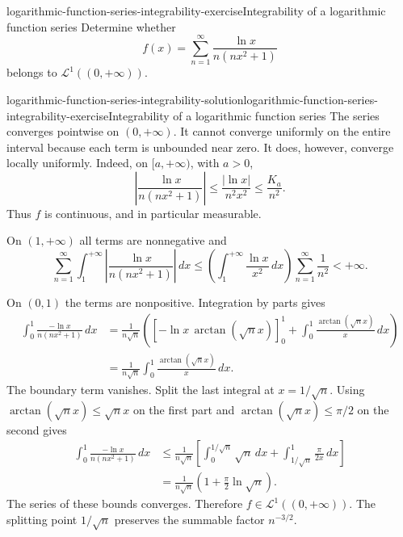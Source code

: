 \documentclass[preview]{standalone}
\begin{document}
\begin{snippetexercise}{logarithmic-function-series-integrability-exercise}{Integrability of a logarithmic function series}
    Determine whether
    \[
        f(x)=\sum_{n=1}^{\infty}\frac{\ln x}{n(nx^2+1)}
    \]
    belongs to \(\mathcal L^1((0,+\infty))\).
\end{snippetexercise}

\begin{snippetsolution}{logarithmic-function-series-integrability-solution}{logarithmic-function-series-integrability-exercise}{Integrability of a logarithmic function series}
    The series converges pointwise on \((0,+\infty)\). It cannot converge
    uniformly on the entire interval because each term is unbounded near
    zero. It does, however, converge locally uniformly. Indeed, on
    \([a,+\infty)\), with \(a>0\),
    \[
        \left|\frac{\ln x}{n(nx^2+1)}\right|
        \leq\frac{|\ln x|}{n^2x^2}
        \leq\frac{K_a}{n^2}.
    \]
    Thus \(f\) is continuous, and in particular measurable.

    On \((1,+\infty)\) all terms are nonnegative and
    \[
        \sum_{n=1}^{\infty}\int_1^{+\infty}
        \left|\frac{\ln x}{n(nx^2+1)}\right|\,dx
        \leq
        \left(\int_1^{+\infty}\frac{\ln x}{x^2}\,dx\right)
        \sum_{n=1}^{\infty}\frac1{n^2}<+\infty.
    \]

    On \((0,1)\) the terms are nonpositive. Integration by parts gives
    \begin{align*}
        \int_0^1\frac{-\ln x}{n(nx^2+1)}\,dx
        &=\frac1{n\sqrt n}
        \left(
            \left[-\ln x\,\arctan(\sqrt n x)\right]_0^1
            +\int_0^1\frac{\arctan(\sqrt n x)}{x}\,dx
        \right)\\
        &=\frac1{n\sqrt n}
        \int_0^1\frac{\arctan(\sqrt n x)}{x}\,dx.
    \end{align*}
    The boundary term vanishes. Split the last integral at
    \(x=1/\sqrt n\). Using
    \(\arctan(\sqrt n x)\leq\sqrt n x\) on the first part and
    \(\arctan(\sqrt n x)\leq\pi/2\) on the second gives
    \begin{align*}
        \int_0^1\frac{-\ln x}{n(nx^2+1)}\,dx
        &\leq\frac1{n\sqrt n}
        \left[
            \int_0^{1/\sqrt n}\sqrt n\,dx
            +\int_{1/\sqrt n}^{1}\frac{\pi}{2x}\,dx
        \right]\\
        &=\frac1{n\sqrt n}
        \left(1+\frac\pi2\ln\sqrt n\right).
    \end{align*}
    The series of these bounds converges. Therefore
    \(f\in\mathcal L^1((0,+\infty))\). The splitting point
    \(1/\sqrt n\) preserves the summable factor \(n^{-3/2}\).
\end{snippetsolution}
\end{document}

